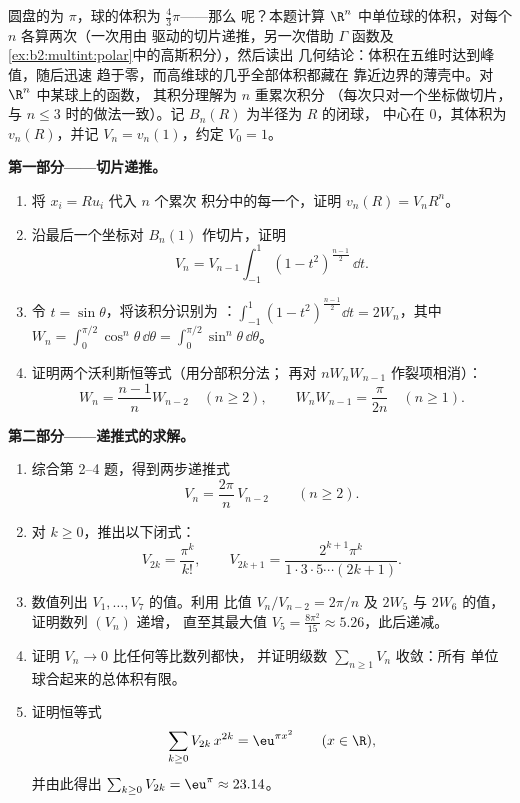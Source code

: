 \begin{problem}[{周末问题——$V_n =
\pi^{n/2}/\Gamma(\frac n2 + 1)$，以及高维的
奇异现象}]\label{pb:b2:multint:1}
圆盘的为 $\pi$，球的体积为 $\frac43\pi$——那么
呢？本题计算
$\R^n$ 中单位球的体积，对每个 $n$ 各算两次（一次用由
驱动的切片递推，另一次借助 $\Gamma$ 函数及
\cref{ex:b2:multint:polar}中的高斯积分），然后读出
几何结论：体积在五维时达到峰值，随后迅速
趋于零，而高维球的几乎全部体积都藏在
靠近边界的薄壳中。对 $\R^n$ 中某球上的函数，
其积分理解为 $n$ 重累次积分
（每次只对一个坐标做切片，与 $n
\leq 3$ 时的做法一致）。记 $B_n(R)$ 为半径为 $R$ 的闭球，
中心在 $0$，其体积为 $v_n(R)$，并记 $V_n =
v_n(1)$，约定 $V_0 = 1$。

\medskip
\noindent\textbf{第一部分——切片递推。}
\begin{enumerate}
  \item 将 $x_i = Ru_i$ 代入 $n$ 个累次
        积分中的每一个，证明 $v_n(R) = V_nR^n$。
  \item 沿最后一个坐标对 $B_n(1)$ 作切片，证明
        \[
        V_n = V_{n-1}\int_{-1}^{1}(1 -
        t^2)^{\frac{n-1}2}\,\dd t .
        \]
  \item 令 $t = \sin\theta$，将该积分识别为
        ：$\int_{-1}^1(1 -
        t^2)^{\frac{n-1}2}\dd t = 2W_n$，其中 $W_n =
        \int_0^{\pi/2}\cos^n\theta\,\dd\theta =
        \int_0^{\pi/2}\sin^n\theta\,\dd\theta$。
  \item 证明两个沃利斯恒等式（用分部积分法；
        再对 $nW_nW_{n-1}$ 作裂项相消）：
        \[
        W_n = \frac{n-1}nW_{n-2} \quad (n \geq 2),
        \qquad
        W_nW_{n-1} = \frac{\pi}{2n} \quad (n \geq 1).
        \]
\end{enumerate}

\medskip
\noindent\textbf{第二部分——递推式的求解。}
\begin{enumerate}[resume]
  \item 综合第 2--4 题，得到两步递推式
        \[
        V_n = \frac{2\pi}{n}\,V_{n-2}
        \qquad (n \geq 2).
        \]
  \item 对 $k \geq 0$，推出以下闭式：
        \[
        V_{2k} = \frac{\pi^k}{k!},
        \qquad
        V_{2k+1} = \frac{2^{k+1}\pi^k}{1\cdot3\cdot5\cdots
        (2k+1)} .
        \]
  \item 数值列出 $V_1, \dots, V_7$ 的值。利用
        比值 $V_n/V_{n-2} = 2\pi/n$ 及 $2W_5$
        与 $2W_6$ 的值，证明数列 $(V_n)$ 递增，
        直至其最大值 $V_5 = \frac{8\pi^2}{15} \approx
        5.26$，此后递减。
  \item 证明 $V_n \to 0$ 比任何等比数列都快，
        并证明级数 $\sum_{n\geq1} V_n$ 收敛：所有
        单位球合起来的总体积有限。
  \item 证明恒等式
        \[
        \sum_{k\geq0} V_{2k}\,x^{2k} = \eu^{\pi x^2}
        \qquad (x \in \R),
        \]
        并由此得出 $\sum_{k\geq0}V_{2k} = \eu^\pi \approx
        23.14$。
\end{enumerate}


\end{problem}
